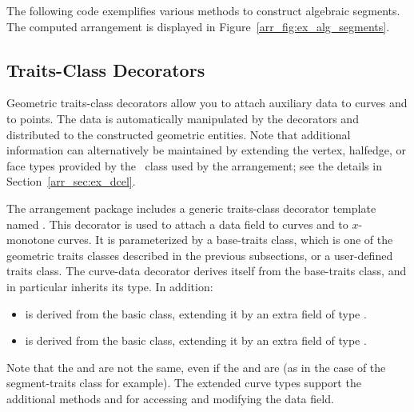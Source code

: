 The following code exemplifies various methods to construct
algebraic segments. The computed arrangement is displayed in
Figure~\ref{arr_fig:ex_alg_segments}.


\subsection{Traits-Class Decorators\label{arr_ssec:meta_tr}}

Geometric traits-class decorators allow you to attach auxiliary
data to curves and to points. The data is automatically manipulated 
by the decorators and distributed to the constructed geometric entities. 
Note that additional information can alternatively be maintained by extending 
the vertex, halfedge, or face types provided by the \dcel\ class used 
by the arrangement; see the details in Section~\ref{arr_sec:ex_dcel}.

The arrangement package includes a generic traits-class decorator
template named 
.
This decorator is used to attach a data field to curves and to
$x$-monotone curves. It is parameterized by a base-traits class, which is
one of the geometric traits classes described in the previous subsections, or
a user-defined traits class. The curve-data decorator derives itself from the
base-traits class, and in particular inherits its  type.
In addition:
\begin{itemize}
\item {} is derived from the basic 
class, extending it by an extra field of type .
%
\item {} is derived from the basic
 class, extending it by an extra field of
type .
\end{itemize}
Note that the  and  are not
the same, even if the  and
 are (as in the case of the 
segment-traits class for example). The extended curve types support the
additional methods  and  for
accessing and modifying the data field.

